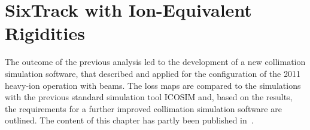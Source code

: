 \chapter{SixTrack with Ion-Equivalent Rigidities }\label{chap:stier}
%
%
%





The outcome of the previous analysis led to the development of a new collimation simulation software, that described and applied for the configuration of the 2011 heavy-ion operation with \lead beams. The loss maps are compared to the simulations with the previous standard simulation tool ICOSIM and, based on the results, the requirements for a further improved collimation simulation software are outlined. The content of this chapter has partly been published in~\cite{phermes_hb2014,NIM:819}.


